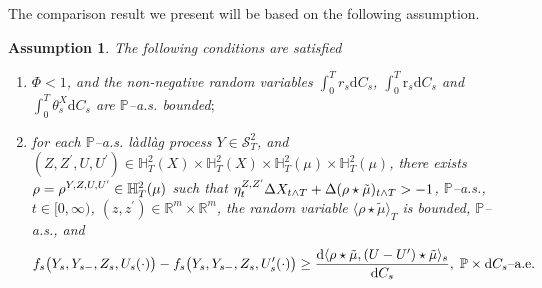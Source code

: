 \documentclass[10pt]{article} %
\newtheorem{assumption}[theorem]{Assumption}
\newcommand\cS{\mathcal S}
\newcommand{\smalltext}[1]{\text{\fontsize{4}{4}\selectfont$#1$}}
\def \H{\mathbb{H}}
\def \P{\mathbb{P}}
\def \R{\mathbb{R}}
\newcommand{\1}{\mathbf{1}}
\def\d{\mathrm{d}}
\begin{document}
The comparison result we present will be based on the following assumption.

\begin{assumption}\label{ass::comparison}
	The following conditions are satisfied
	\begin{enumerate}
		\item[$(i)$] $\Phi < 1$, and the non-negative random variables $\int_0^T r_s \d C_s$, $\int_0^T \mathrm{r}_s \d C_s$ and $\int_0^T \theta^X_s \d C_s$ are $\P$--{\rm a.s.} bounded$;$
		\item[$(ii)$] for each $\P$--{\rm a.s.} l\`adl\`ag process $Y \in \cS^2_T$,  and $(Z,Z^\prime,U,U^\prime) \in \H^2_T(X) \times \H^2_T(X) \times \H^2_T(\mu) \times \H^2_T(\mu)$, there exists $\rho = \rho^{Y,Z,U,U^\smalltext{\prime}} \in \H^2_T(\mu)$ such that $\eta^{Z,Z^\smalltext{\prime}}_t\Delta X_{t \land T} + \Delta (\rho \star \tilde\mu)_{t \land T} > -1$, $\P$--{\rm a.s.}, $t \in [0,\infty)$, $(z,z^\prime) \in \R^m \times \R^m$, the random variable $\langle \rho \star \tilde\mu\rangle_T$ is bounded, $\P$--{\rm a.s.}, and
			\begin{equation}\label{eq::comparison_inequality}
				f_s\big(Y_s,Y_{s-},Z_s,U_s(\cdot)\big) - f_s\big(Y_s,Y_{s-},Z_s,U^\prime_s(\cdot)\big) 
				\geq \frac{\d\langle \rho \star\tilde\mu,(U-U^\prime)\star\tilde\mu\rangle_s}{\d C_s}, \; \text{$\P \times \d C_s$--{\rm a.e.}}
			\end{equation}
	\end{enumerate}
\end{assumption}
\end{document}
